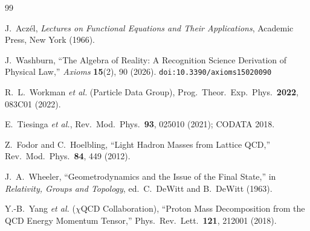 \documentclass[12pt,a4paper]{article}
\theoremstyle{definition}
\theoremstyle{remark}
\begin{document}
\begin{thebibliography}{99}

J.~Acz\'el, \emph{Lectures on Functional Equations and Their Applications},
Academic Press, New York (1966).

J.~Washburn, ``The Algebra of Reality: A Recognition Science Derivation
of Physical Law,'' \emph{Axioms} \textbf{15}(2), 90 (2026).
\texttt{doi:10.3390/axioms15020090}

R.~L.~Workman \textit{et al.} (Particle Data Group),
Prog.\ Theor.\ Exp.\ Phys.\ \textbf{2022}, 083C01 (2022).

E.~Tiesinga \textit{et al.}, Rev.\ Mod.\ Phys.\
\textbf{93}, 025010 (2021); CODATA 2018.

Z.~Fodor and C.~Hoelbling, ``Light Hadron Masses from
Lattice QCD,'' Rev.\ Mod.\ Phys.\ \textbf{84}, 449 (2012).

J.~A.~Wheeler, ``Geometrodynamics and the Issue of the Final
State,'' in \textit{Relativity, Groups and Topology},
ed.\ C.~DeWitt and B.~DeWitt (1963).

Y.-B.~Yang \textit{et al.} ($\chi$QCD Collaboration),
``Proton Mass Decomposition from the QCD Energy Momentum
Tensor,'' Phys.\ Rev.\ Lett.\ \textbf{121}, 212001 (2018).
\end{thebibliography}
\end{document}
